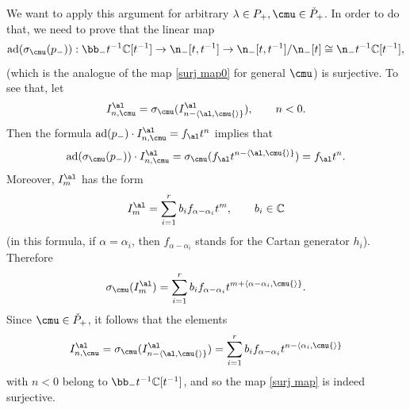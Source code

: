 \documentclass{amsart}
\newcommand{\bra}{{\langle}}
\newcommand{\ket}{{\rangle}}
\newcommand{\on}{\operatorname}
\newcommand{\+}{\mathop{\oplus}}
\renewcommand{\*}{{\otimes}}
\newcommand{\C}{\mathbb{C}}
\newcommand{\lam}{\lambda}
\theoremstyle{theorem}
\theoremstyle{remark}
\numberwithin{equation}{section}
\begin{document}
We want to apply this argument for arbitrary $\lam \in P_+, \cmu \in
\check{P}_+$. In order to do that, we need to prove that the linear
map
\begin{equation}    \label{surj map}
\on{ad}(\sigma_\cmu(p_-)): \bb_- t^{-1}\C[t^{-1}] \to \n_-[t,t^{-1}]
\to \n_-[t,t^{-1}]/\n_-[t] \cong \n_- t^{-1}\C[t^{-1}],
\end{equation}
(which is the analogue of the map \eqref{surj map0} for general $\cmu$)
is surjective. To see that, let
\begin{equation}    \label{Ialncmu}
I^\al_{n,\cmu} = \sigma_\cmu(I^\al_{n-\bra \al,\cmu \ket}), \qquad n<0.
\end{equation}
Then the formula $\on{ad}(p_-) \cdot I^\al_{n,\cmu} = f_\al t^n$
implies that
$$
\on{ad}(\sigma_\cmu(p_-)) \cdot I^\al_{n,\cmu} = \sigma_{\cmu}(f_\al
t^{n-\bra \al,\cmu \ket}) = f_\al t^n.
$$
Moreover, $I^\al_m$ has the form
$$
I^\al_m = \sum_{i=1}^r b_i f_{\alpha-\alpha_i} t^m, \qquad b_i \in \C
$$
(in this formula, if $\alpha=\alpha_i$, then $f_{\alpha-\alpha_i}$
stands for the Cartan generator $h_i$). Therefore
$$
\sigma_\cmu(I^\al_m) = \sum_{i=1}^r b_i f_{\alpha-\alpha_i}
t^{m+\bra\alpha-\alpha_i,\cmu\ket}.
$$
Since $\cmu \in \check{P}_+$, it follows that the elements
$$
I^\al_{n,\cmu} = \sigma_\cmu(I^\al_{n-\bra \al,\cmu \ket}) =
\sum_{i=1}^r b_i f_{\alpha-\alpha_i} t^{n-\bra\alpha_i,\cmu\ket}
$$
with $n<0$ belong to $\bb_- t^{-1} \C[t^{-1}]$, and so the map
\eqref{surj map} is indeed surjective.
\end{document}
